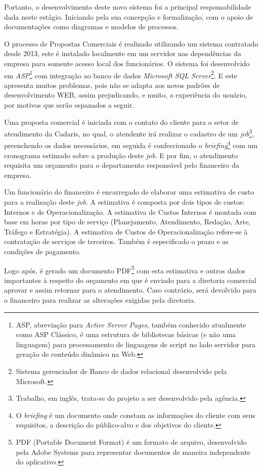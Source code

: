 \documentclass[
  12pt,            %
  openany,
  oneside,
  a4paper,         %
  english,      %
  brazil
]{article}
\numberwithin{figure}{section}
\numberwithin{table}{section}
\begin{document}
Portanto, o desenvolvimento deste novo sistema foi a principal responsabilidade dada neste estágio. Iniciando pela sua concepção e formalização, com o apoio de documentações como diagramas e modelos de processos.

O processo de Propostas Comerciais é realizado utilizando um sistema contratado desde 2013, este é instalado localmente em um servidor nas dependências da empresa para somente acesso local dos funcionários. O sistema foi desenvolvido em \textit{ASP}\footnote{ASP, abreviação para \textit{Active Server Pages}, também conhecido atualmente como ASP Clássico, é uma estrutura de bibliotecas básicas (e não uma linguagem) para processamento de linguagens de script no lado servidor para geração de conteúdo dinâmico na Web.} com integração ao banco de dados \textit{Microsoft SQL Server}\footnote{Sistema gerenciador de Banco de dados relacional desenvolvido pela Microsoft.}. E este apresenta muitos problemas, pois não se adapta aos novos padrões de desenvolvimento WEB, assim prejudicando, e muito, a experiência do usuário, por motivos que serão espanados a seguir.

Uma proposta comercial é iniciada com o contato do cliente para o setor de atendimento da Cadaris, no qual, o atendente irá realizar o cadastro de um \textit{job}\footnote{Trabalho, em inglês, trata-se do projeto a ser desenvolvido pela agência.}, preenchendo os dados necessários, em seguida é confeccionado o \textit{briefing}\footnote{O \textit{briefing} é um documento onde constam as informações do cliente com seus requisitos, a descrição do público-alvo e dos objetivos do cliente.} com um cronograma estimado sobre a produção deste \textit{job}. E por fim, o atendimento requisita um orçamento para o departamento responsável pelo financeiro da empresa.

Um funcionário do financeiro é encarregado de elaborar uma estimativa de custo para a realização deste \textit{job}. A estimativa é composta por dois tipos de custos: Internos e de Operacionalização. A estimativa de Custos Internos é montada com base em horas por tipo de serviço (Planejamento, Atendimento, Redação, Arte, Tráfego e Estratégia). A estimativa de Custos de Operacionalização refere-se à contratação de serviços de terceiros. Também é especificado o prazo e as condições de pagamento.

Logo após, é gerado um documento PDF\footnote{PDF (Portable Document Format) é um formato de arquivo, desenvolvido pela Adobe Systems para representar documentos de maneira independente do aplicativo.} com esta estimativa e outros dados importantes à respeito do orçamento em que é enviado para a diretoria comercial aprovar e assim retornar para o atendimento. Caso contrário, será devolvido para o financeiro para realizar as alterações exigidas pela diretoria.
\end{document}
